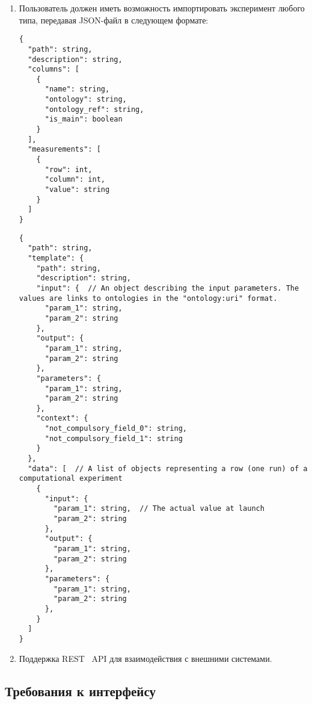 \documentclass[a4paper,12pt,reqno]{article}
\begin{document}
\begin{enumerate}
        \begin{enumerate}[label=\arabic{enumi}.\arabic*.]
            \item Пользователь должен иметь возможность импортировать эксперимент любого типа, передавая JSON-файл в следующем формате:
            \begin{lstlisting}[frame=single, basicstyle=\footnotesize\ttfamily, label={lst:lab_import}, caption={Формат данных для импорта лабораторого эксперимента},captionpos=b, breaklines=true, breakatwhitespace=true]
{
  "path": string,
  "description": string,
  "columns": [
    {
      "name": string,
      "ontology": string,
      "ontology_ref": string,
      "is_main": boolean
    }
  ],
  "measurements": [
    {
      "row": int,
      "column": int,
      "value": string
    }
  ]
}
            \end{lstlisting}
            \begin{lstlisting}[frame=single, basicstyle=\footnotesize\ttfamily, label={lst:comp_import}, caption={Формат данных для импорта вычислительного эксперимента},captionpos=b, breaklines=true, breakatwhitespace=true]
{
  "path": string,
  "template": {
    "path": string,
    "description": string,
    "input": {  // An object describing the input parameters. The values are links to ontologies in the "ontology:uri" format.
      "param_1": string,
      "param_2": string
    },
    "output": {
      "param_1": string,
      "param_2": string
    },
    "parameters": {
      "param_1": string,
      "param_2": string
    },
    "context": {
      "not_compulsory_field_0": string,
      "not_compulsory_field_1": string
    }
  },
  "data": [  // A list of objects representing a row (one run) of a computational experiment
    {
      "input": {
        "param_1": string,  // The actual value at launch
        "param_2": string
      },
      "output": {
        "param_1": string,
        "param_2": string
      },
      "parameters": {
        "param_1": string,
        "param_2": string
      },
    }
  ]
}
            \end{lstlisting}
            \item Поддержка REST~\cite{arch:REST} API для взаимодействия с внешними системами.
        \end{enumerate}
    \end{enumerate}

    \subsection{Требования к интерфейсу}
\end{document}
